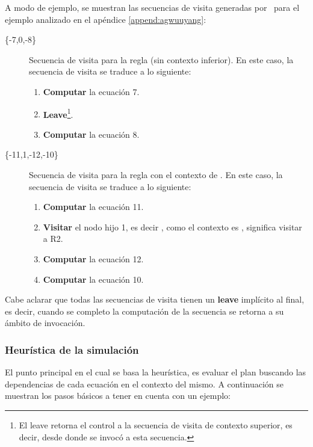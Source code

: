 A modo de ejemplo, se muestran las secuencias de visita generadas por \maggen\ para el ejemplo analizado en el apéndice \ref{append:agwuuyang}:

\begin{description}
\item [\{-7,0,-8\}] Secuencia de visita para la regla  (sin contexto inferior). En este caso, la secuencia de visita se traduce a lo siguiente:

\begin{enumerate}
\item \textbf{Computar} la ecuación 7.
\item \textbf{Leave}\footnote{El leave retorna el control a la secuencia de visita de contexto superior, es decir, desde donde se invocó a esta secuencia.}.
\item \textbf{Computar} la ecuación 8.
\end{enumerate}

\item [\{-11,1,-12,-10\}] Secuencia de visita para la regla  con el contexto de . En este caso, la secuencia de visita se traduce a lo siguiente:

\begin{enumerate}
\item \textbf{Computar} la ecuación 11.
\item \textbf{Visitar} el nodo hijo 1, es decir , como el contexto es , significa visitar a R2.
\item \textbf{Computar} la ecuación 12.
\item \textbf{Computar} la ecuación 10.
\end{enumerate}
\end{description}

Cabe aclarar que todas las secuencias de visita tienen un \textbf{leave} implícito al final, es decir, cuando se completo la computación de la secuencia se retorna a su ámbito de invocación.

\subsubsection{Heurística de la simulación}
\label{subsec:heuris-simul}
El punto principal en el cual se basa la heurística, es evaluar el plan buscando las dependencias de cada ecuación en el contexto del mismo. A continuación se muestran los pasos básicos a tener en cuenta con un ejemplo:\\

